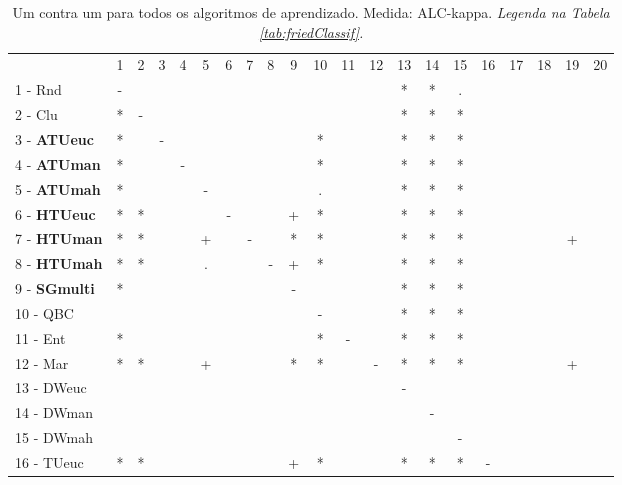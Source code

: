 \begin{table}[h]
\caption{Um contra um para todos os algoritmos de aprendizado. Medida: ALC-kappa. \textit{Legenda na Tabela \ref{tab:friedClassif}.}}
\begin{center}\begin{tabular}{lcc|cc|cc|cc|cc|cc|cc|cc|cc|cc}
 			& 1 & 2 & 3 & 4 & 5 & 6 & 7 & 8 & 9 & 10 & 11 & 12 & 13 & 14 & 15 & 16 & 17 & 18 & 19 & 20\\
1 - Rnd  	& - &   &   &   &   &   &   &   &   &   &   &   & * & * & . &   &   &   &   &   \\
2 - Clu  	& * & - &   &   &   &   &   &   &   &   &   &   & * & * & * &   &   &   &   &   \\ \hline
3 - \textbf{ATUeuc}	& * &   & - &   &   &   &   &   &   & * &   &   & * & * & * &   &   &   &   &   \\
4 - \textbf{ATUman}	& * &   &   & - &   &   &   &   &   & * &   &   & * & * & * &   &   &   &   &   \\ \hline
5 - \textbf{ATUmah}	& * &   &   &   & - &   &   &   &   & . &   &   & * & * & * &   &   &   &   &   \\
6 - \textbf{HTUeuc}	& * & * &   &   &   & - &   &   & + & * &   &   & * & * & * &   &   &   &   &   \\ \hline
7 - \textbf{HTUman}	& * & * &   &   & + &   & - &   & * & * &   &   & * & * & * &   &   &   & + &   \\
8 - \textbf{HTUmah}	& * & * &   &   & . &   &   & - & + & * &   &   & * & * & * &   &   &   &   &   \\ \hline
9 - \textbf{SGmulti}	& * &   &   &   &   &   &   &   & - &   &   &   & * & * & * &   &   &   &   &   \\
10 - QBC  	&   &   &   &   &   &   &   &   &   & - &   &   & * & * & * &   &   &   &   &   \\ \hline
11 - Ent  	& * &   &   &   &   &   &   &   &   & * & - &   & * & * & * &   &   &   &   &   \\
12 - Mar  	& * & * &   &   & + &   &   &   & * & * &   & - & * & * & * &   &   &   & + &   \\ \hline
13 - DWeuc	&   &   &   &   &   &   &   &   &   &   &   &   & - &   &   &   &   &   &   &   \\
14 - DWman	&   &   &   &   &   &   &   &   &   &   &   &   &   & - &   &   &   &   &   &   \\ \hline
15 - DWmah	&   &   &   &   &   &   &   &   &   &   &   &   &   &   & - &   &   &   &   &   \\
16 - TUeuc	& * & * &   &   &   &   &   &   & + & * &   &   & * & * & * & - &   &   &   &   \\ \hline

\end{tabular}
\end{center}
\end{table}
